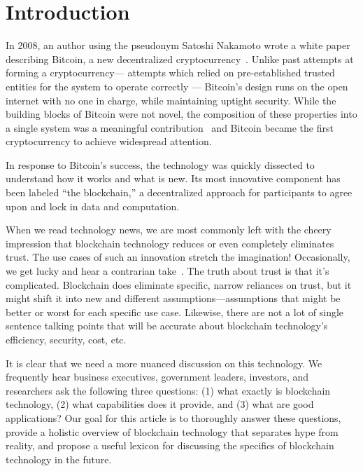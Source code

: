 
\section{Introduction}

In 2008, an author using the pseudonym Satoshi Nakamoto wrote a white paper describing Bitcoin, a new decentralized cryptocurrency~\cite{Nak08}. Unlike past attempts at forming a cryptocurrency--- attempts which relied on pre-established trusted entities for the system to operate correctly --- Bitcoin's design runs on the open internet with no one in charge, while maintaining uptight security. While the building blocks of Bitcoin were not novel, the composition of these properties into a single system was a meaningful contribution~\cite{Narayanan17} and Bitcoin became the first cryptocurrency to achieve widespread attention.

In response to Bitcoin's success, the technology was quickly dissected to understand how it works and what is new. Its most innovative component has been labeled ``the blockchain,'' a decentralized approach for participants to agree upon and lock in data and computation.

When we read technology news, we are most commonly left with the cheery impression that blockchain technology reduces or even completely eliminates trust. The use cases of such an innovation stretch the imagination! Occasionally, we get lucky and hear a contrarian take~\cite{}. The truth about trust is that it's complicated. Blockchain does eliminate specific, narrow reliances on trust, but it might shift it into new and different assumptions---assumptions that might be better or worst for each specific use case. Likewise, there are not a lot of single sentence talking points that will be accurate about blockchain technology's efficiency, security, cost, etc. 

It is clear that we need a more nuanced discussion on this technology. We frequently hear business executives, government leaders, investors, and researchers ask the following three questions: (1) what exactly is blockchain technology, (2) what capabilities does it provide, and (3) what are good applications? Our goal for this article is to thoroughly answer these questions,  provide a holistic overview of blockchain technology that separates hype from reality, and propose a useful lexicon for discussing the specifics of blockchain technology in the future.

